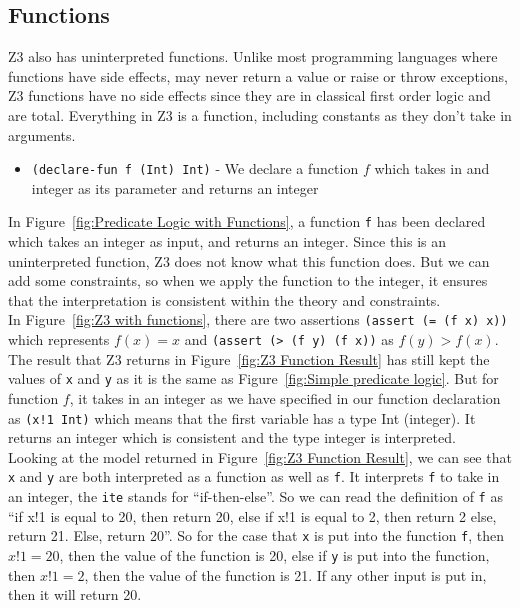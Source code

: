 \documentclass[a4paper]{report}
\begin{document}
\subsection{Functions}
Z3 also has uninterpreted functions. Unlike most programming languages where functions have side effects, may never return a value or raise or throw exceptions, Z3 functions have no side effects since they are in classical first order logic and are total.
Everything in Z3 is a function, including constants as they don’t take in arguments.
\begin{itemize}
\item \texttt{(declare-fun f (Int) Int)} - We declare a function $f$ which takes in and integer as its parameter and returns an integer
\end{itemize}

In Figure~\ref{fig:Predicate Logic with Functions}, a function \texttt{f} has been declared which takes an integer as input, and returns an integer. Since this is an uninterpreted function, Z3 does not know what this function does. But we can add some constraints, so when we apply the function to the integer, it ensures that the interpretation is consistent within the theory and constraints. \\

In Figure~\ref{fig:Z3 with functions}, there are two assertions \texttt{(assert (= (f x) x))} which represents $f(x) = x$ and \texttt{(assert (> (f y) (f x))} as $f(y) > f(x)$. The result that Z3 returns in Figure~\ref{fig:Z3 Function Result} has still kept the values of \texttt{x} and \texttt{y} as it is the same as Figure~\ref{fig:Simple predicate logic}. But for function $f$, it takes in an integer as we have specified in our function declaration as \texttt{(x!1 Int)} which means that the first variable has a type Int (integer). It returns an integer which is consistent and the type integer is interpreted. \\

Looking at the model returned in Figure~\ref{fig:Z3 Function Result}, we can see that \texttt{x} and \texttt{y} are both interpreted as a function as well as \texttt{f}. It interprets \texttt{f} to take in an integer, the \texttt{ite} stands for ``if-then-else''. So we can read the definition of \texttt{f} as “if x!1 is equal to 20, then return 20, else if x!1 is equal to 2, then return 2 else, return 21. Else, return 20”. So for the case that \texttt{x} is put into the function \texttt{f}, then $x!1 = 20$, then the value of the function is 20, else if \texttt{y} is put into the function, then $x!1 = 2$, then the value of the function is 21. If any other input is put in, then it will return 20. \\
\end{document}
